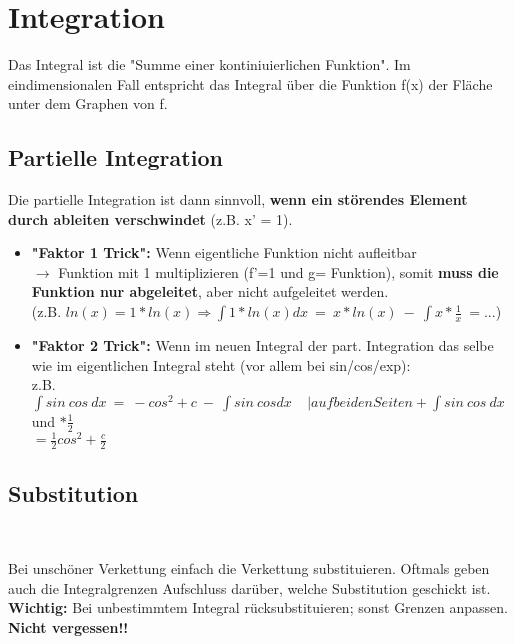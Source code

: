 \documentclass[a4paper,12pt]{article} %
\begin{document}
\section{Integration}
Das Integral ist die "Summe einer kontiniuierlichen Funktion". Im eindimensionalen Fall entspricht das Integral über die Funktion f(x) der Fläche unter dem Graphen von f.

\subsection{Partielle Integration}
\begin{center}
\end{center}
Die partielle Integration ist dann sinnvoll, \textbf{wenn ein störendes Element durch ableiten verschwindet} (z.B. x' = 1).
\begin{itemize}
\item \textbf{"Faktor 1 Trick":} Wenn eigentliche Funktion nicht aufleitbar\\
$\rightarrow$ Funktion mit 1 multiplizieren (f'=1 und g= Funktion), somit \textbf{muss die Funktion nur abgeleitet}, aber nicht aufgeleitet werden.\\
(z.B. $ln(x) = 1*ln(x) \Rightarrow \int 1*ln(x) dx \ = \ x*ln(x) \ - \ \int x*\frac{1}{x} \ = ...$)
\item \textbf{"Faktor 2 Trick":} Wenn im neuen Integral der part. Integration das selbe wie im eigentlichen Integral steht (vor allem bei sin/cos/exp):\\
z.B. $\int sin \ cos \ dx \ = \ -cos^2 + c \ - \ \int sin \ cos dx \  \ \ \ \ |auf beiden Seiten +\int sin \ cos \ dx$ und $*\frac{1}{2}$\\
$= \frac{1}{2} cos^2 + \frac{c}{2}$
\end{itemize}

\subsection{Substitution}
\begin{center}
 \\
\end{center}
Bei unschöner Verkettung einfach die Verkettung substituieren. Oftmals geben auch die Integralgrenzen Aufschluss darüber, welche Substitution geschickt ist.\\
\textbf{Wichtig:} Bei unbestimmtem Integral rücksubstituieren; sonst Grenzen anpassen. \textbf{Nicht vergessen!!}
\end{document}
